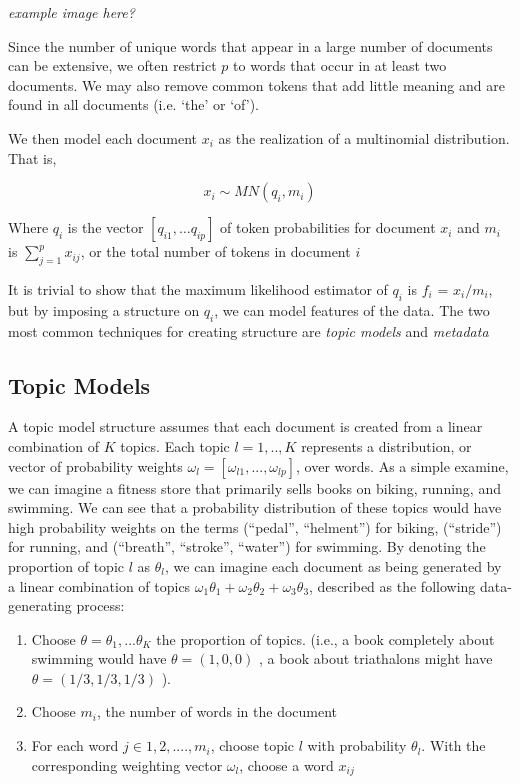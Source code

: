 \documentclass[]{article}
\begin{document}
\emph{example image here?}

Since the number of unique words that appear in a large number of
documents can be extensive, we often restrict $p$ to words that occur in
at least two documents. We may also remove common tokens that add little
meaning and are found in all documents (i.e. `the' or `of').

We then model each document $x_i$ as the realization of a multinomial
distribution. That is,

\[ x_{i} \sim MN(q_i,m_i) \]

Where $q_i$ is the vector $[q_{i1}, \dots q_{ip}]$ of token
probabilities for document $x_i$ and $m_i$ is
$\sum_{j = 1}^{p}{x_{ij}}$, or the total number of tokens in document
$i$

It is trivial to show that the maximum likelihood estimator of $q_i$ is
$f_i$ = $x_i / m_i$, but by imposing a structure on $q_i$, we can model
features of the data. The two most common techniques for creating
structure are \emph{topic models} and \emph{metadata}

\subsection{Topic Models}\label{topic-models}

A topic model structure assumes that each document is created from a
linear combination of $K$ topics. Each topic $l = 1,..,K$ represents a
distribution, or vector of probability weights
$\omega_l = [\omega_{l1}, ... , \omega_{lp}]$, over words. As a simple
examine, we can imagine a fitness store that primarily sells books on
biking, running, and swimming. We can see that a probability
distribution of these topics would have high probability weights on the
terms (``pedal'', ``helment'') for biking, (``stride'') for running, and
(``breath'', ``stroke'', ``water'') for swimming. By denoting the
proportion of topic $l$ as $\theta_l$, we can imagine each document as
being generated by a linear combination of topics
$\omega_1 \theta_1 + \omega_2 \theta_2 + \omega_3 \theta_3$, described
as the following data-generating process:

\begin{enumerate}
\def\labelenumi{\arabic{enumi}.}
\itemsep1pt\parskip0pt
\item
  Choose $\theta = \theta_1,...\theta_K$ the proportion of topics.
  (i.e., a book completely about swimming would have $\theta=(1,0,0)$ ,
  a book about triathalons might have $\theta =(1/3,1/3,1/3)$ ).
\item
  Choose $m_i$, the number of words in the document
\item
  For each word $j \in 1,2,....,m_i$, choose topic $l$ with probability
  $\theta_l$. With the corresponding weighting vector $\omega_l$, choose
  a word $x_{ij}$
\end{enumerate}
\end{document}
